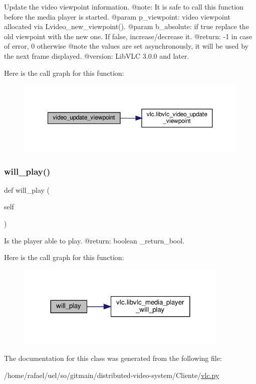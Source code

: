 \begin{DoxyVerb}Update the video viewpoint information.
@note: It is safe to call this function before the media player is started.
@param p_viewpoint: video viewpoint allocated via L{video_new_viewpoint}().
@param b_absolute: if true replace the old viewpoint with the new one. If false, increase/decrease it.
@return: -1 in case of error, 0 otherwise @note the values are set asynchronously, it will be used by the next frame displayed.
@version: LibVLC 3.0.0 and later.
\end{DoxyVerb}
 Here is the call graph for this function\+:
\nopagebreak
\begin{figure}[H]
\begin{center}
\leavevmode
\includegraphics[width=350pt]{classvlc_1_1_media_player_ad248ed33e6ee4b9f0de5627464010857_cgraph}
\end{center}
\end{figure}
\mbox{\label{classvlc_1_1_media_player_a8e7441d35e342d865d4d5e2c75977443}} 
\subsubsection{\texorpdfstring{will\+\_\+play()}{will\_play()}}
{\footnotesize\ttfamily def will\+\_\+play (\begin{DoxyParamCaption}\item[{}]{self }\end{DoxyParamCaption})}

\begin{DoxyVerb}Is the player able to play.
@return: boolean \libvlc_return_bool.
\end{DoxyVerb}
 Here is the call graph for this function\+:
\nopagebreak
\begin{figure}[H]
\begin{center}
\leavevmode
\includegraphics[width=288pt]{classvlc_1_1_media_player_a8e7441d35e342d865d4d5e2c75977443_cgraph}
\end{center}
\end{figure}


The documentation for this class was generated from the following file\+:\begin{DoxyCompactItemize}
\item 
/home/rafael/uel/so/gitmain/distributed-\/video-\/system/\+Cliente/\hyperlink{vlc_8py}{vlc.\+py}\end{DoxyCompactItemize}
